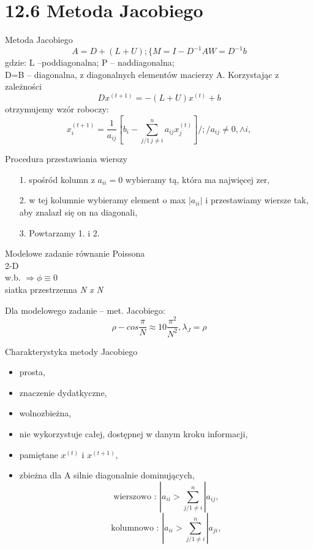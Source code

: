 \section{12.6 Metoda Jacobiego}

\begin{frame}{Metoda Jacobiego}
  $$ A=D+(L+U);\{M=I-D^{-1}AW=D^{-1}b $$
  gdzie: L --poddiagonalna; P -- naddiagonalna;\\
  D=B -- diagonalna, z diagonalnych elementów macierzy A. Korzystając z zależności
  $$\boxed{Dx^{(t+1)}= -(L+U)x^{(t)}+b}$$
  otrzymujemy wzór roboczy:
  $$x_i^{(t+1)}=\frac{1}{a_{ij}}[b_i-\sum_{j/1\,j\neq i}^{n} a_{ij}x_j^{(t)}]/ ;/ a_{ij} \neq 0,\wedge i,$$
\end{frame}

\begin{frame}
  \begin{block}{Procedura przestawiania wierszy}
    \begin{itemize}
      \item[1.] spośród kolumn z $a_{ii} = 0$ wybieramy tą, która ma najwięcej zer,
      \item[2.] w tej kolumnie wybieramy element o max $|a_{ii}|$ i przestawiamy wiersze tak, aby znalazł się on na diagonali,
      \item[3.] Powtarzamy 1. i 2.
    \end{itemize}
  \end{block}
\end{frame}

\begin{frame}{}
  \begin{block}{Modelowe zadanie}
    równanie Poissona
    \\2-D
    \\w.b. $\Rightarrow\phi\equiv 0$
    \\siatka przestrzenna \emph{N x N}
  \end{block}

  \begin{block}{Dla modelowego zadanie -- met. Jacobiego:}
    $$\rho - cos\frac{\pi}{N}\approx 1 0 \frac{\pi^2}{N^2}, \lambda _J = \rho$$
  \end{block}
\end{frame}

\begin{frame}{}
  \begin{block}{Charakterystyka metody Jacobiego}
    \begin{itemize}
      \item prosta,
      \item znaczenie dydatkyczne,
      \item wolnozbieżna,
      \item nie wykorzystuje całej, dostępnej w danym kroku informacji,
      \item pamiętane $x^{(t)}$ i $x^{(t+1)}$,
      \item zbieżna dla A silnie diagonalnie dominujących,
      $$\text{wierszowo : }|a_{ii} > \sum_{j/1\neq i}^{n} |a_{ij},$$
      $$\text{kolumnowo : }|a_{ii} > \sum_{j/1\neq i}^{n} |a_{ji},$$
    \end{itemize}
  \end{block}
\end{frame}
